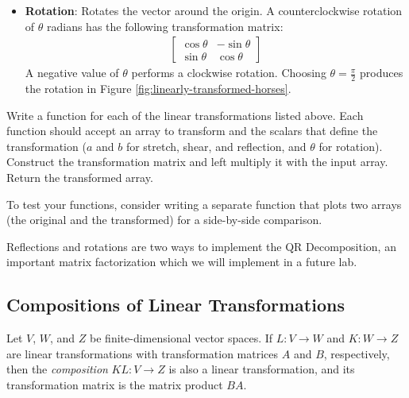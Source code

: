 \begin{itemize}
\item \textbf{Rotation}: %
Rotates the vector around the origin.
A counterclockwise rotation of $\theta$ radians has the following transformation matrix:
%
\begin{align*}
\left[\begin{array}{rr}
\cos\theta & -\sin\theta\\
\sin\theta &  \cos\theta
\end{array}\right]
\end{align*}
%
A negative value of $\theta$ performs a clockwise rotation.
Choosing $\theta = \frac{\pi}{2}$ produces the rotation in Figure \ref{fig:linearly-transformed-horses}.

\end{itemize}

\begin{problem} %
Write a function for each of the linear transformations listed above.
Each function should accept an array to transform and the scalars that define the transformation ($a$ and $b$ for stretch, shear, and reflection, and $\theta$ for rotation).
Construct the transformation matrix and left multiply it with the input array.
Return the transformed array.

To test your functions, consider writing a separate function that plots two arrays (the original and the transformed) for a side-by-side comparison.
\end{problem}

\begin{info} %
Reflections and rotations are two ways to implement the QR Decomposition, an important matrix factorization which we will implement in a future lab. %
\end{info}

\subsection*{Compositions of Linear Transformations} %

Let $V$, $W$, and $Z$ be finite-dimensional vector spaces.
If $L:V\rightarrow W$ and $K:W\rightarrow Z$ are linear transformations with transformation matrices $A$ and $B$, respectively, then the \emph{composition} $KL:V\rightarrow Z$ is also a linear transformation, and its transformation matrix is the matrix product $BA$.

